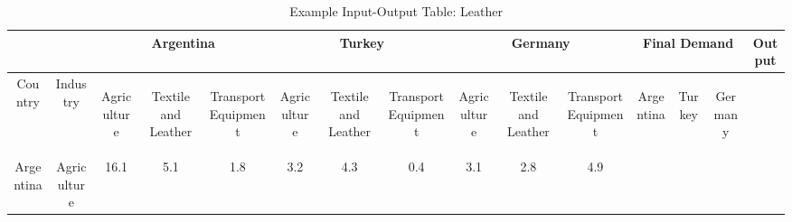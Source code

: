 \documentclass[a4paper]{article}\usepackage[]{graphicx}\usepackage[]{color}
\providecommand{\tabularnewline}{\\}
\begin{document}
\begin{sidewaystable}
\caption{Example Input-Output Table: Leather}

\begin{tabular}{|c|c|c|c|c|c|c|c|c|c|c|c|c|c|c|}
\hline 
 &
 &
\multicolumn{3}{c|}{{\scriptsize{}Argentina}} &
\multicolumn{3}{c|}{{\scriptsize{}Turkey}} &
\multicolumn{3}{c|}{{\scriptsize{}Germany}} &
\multicolumn{3}{c|}{{\scriptsize{}Final Demand}} &
{\scriptsize{}Output }\tabularnewline
\hline 
\hline 
{\scriptsize{}Country } &
{\scriptsize{}Industry } &
\begin{turn}{90}
{\scriptsize{}Agriculture}
\end{turn} &
\begin{turn}{90}
{\scriptsize{}Textile and Leather}
\end{turn} &
\begin{turn}{90}
{\scriptsize{}Transport Equipment}
\end{turn} &
\begin{turn}{90}
{\scriptsize{}Agriculture}
\end{turn} &
\begin{turn}{90}
{\scriptsize{}Textile and Leather}
\end{turn} &
\begin{turn}{90}
{\scriptsize{}Transport Equipment}
\end{turn} &
\begin{turn}{90}
{\scriptsize{}Agriculture}
\end{turn} &
\begin{turn}{90}
{\scriptsize{}Textile and Leather}
\end{turn} &
\begin{turn}{90}
{\scriptsize{}Transport Equipment}
\end{turn} &
\begin{turn}{90}
{\scriptsize{}Argentina}
\end{turn} &
\begin{turn}{90}
{\scriptsize{}Turkey}
\end{turn} &
\begin{turn}{90}
{\scriptsize{}Germany}
\end{turn} &
\begin{turn}{90}
\end{turn}\tabularnewline
\hline 
{\scriptsize{}Argentina } &
{\scriptsize{}Agriculture } &
{\scriptsize{}16.1 } &
{\scriptsize{}5.1 } &
{\scriptsize{}1.8 } &
{\scriptsize{}3.2 } &
{\scriptsize{}4.3 } &
{\scriptsize{}0.4 } &
{\scriptsize{}3.1 } &
{\scriptsize{}2.8 } &
{\scriptsize{}4.9 } &

\end{tabular}
\end{sidewaystable}
\end{document}
